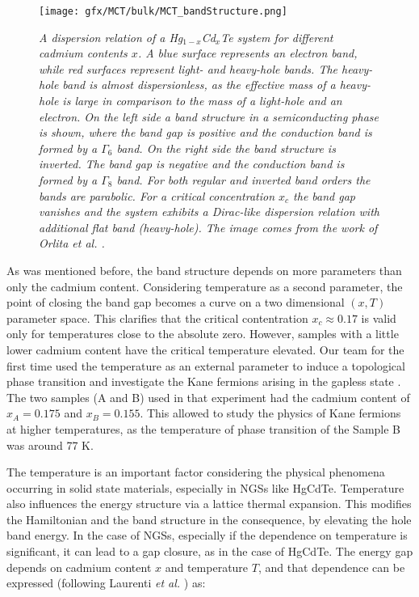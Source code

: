\documentclass[titlepage,a4paper]{book}
\begin{document}
\begin{figure}[ht]
	\centering
	\texttt{[image: gfx/MCT/bulk/MCT\_bandStructure.png]}
	\vspace{-10pt}
	\caption{\textit{A dispersion relation of a Hg$_{1-x}$Cd$_x$Te system for different cadmium contents $x$. A blue surface represents an electron band, while red surfaces represent light- and heavy-hole bands. The heavy-hole band is almost dispersionless, as the effective mass of a heavy-hole is large in comparison to the mass of a light-hole and an electron. On the left side a band structure in a semiconducting phase is shown, where the band gap is positive and the conduction band is formed by a $\Gamma_6$ band. On the right side the band structure is inverted. The band gap is negative and the conduction band is formed by a $\Gamma_8$ band. For both regular and inverted band orders the bands are parabolic. For a critical concentration $x_c$ the band gap vanishes and the system exhibits a Dirac-like dispersion relation with additional flat band (heavy-hole). The image comes from the work of Orlita \textit{et al.} \cite{Orlita_MCT}.}}
	\label{fig:MCT_bandStructure}
\end{figure} 

As was mentioned before, the band structure depends on more parameters than only the cadmium content. Considering temperature as a second parameter, the point of closing the band gap becomes a curve on a two dimensional $(x, T)$ parameter space. This clarifies that the critical contentration $x_c \approx 0.17$ is valid only for temperatures close to the absolute zero. However, samples with a little lower cadmium content have the critical temperature elevated. Our team for the first time used the temperature as an external parameter to induce a topological phase transition and investigate the Kane fermions arising in the gapless state \cite{Teppe_MCT}. The two samples (A and B) used in that experiment had the cadmium content of $x_A = 0.175$ and $x_B = 0.155$. This allowed to study the physics of Kane fermions at higher temperatures, as the temperature of phase transition of the Sample B was around 77 K.  

The temperature is an important factor considering the physical phenomena occurring in solid state materials, especially in NGSs like HgCdTe. Temperature also influences the energy structure via a lattice thermal expansion. This modifies the Hamiltonian and the band structure in the consequence, by elevating the hole band energy. In the case of NGSs, especially if the dependence on temperature is significant, it can lead to a gap closure, as in the case of HgCdTe. The energy gap depends on cadmium content $x$ and temperature $T$, and that dependence can be expressed (following Laurenti \textit{et al.} \cite{Laurenti_MCT_bulk}) as:
\end{document}
